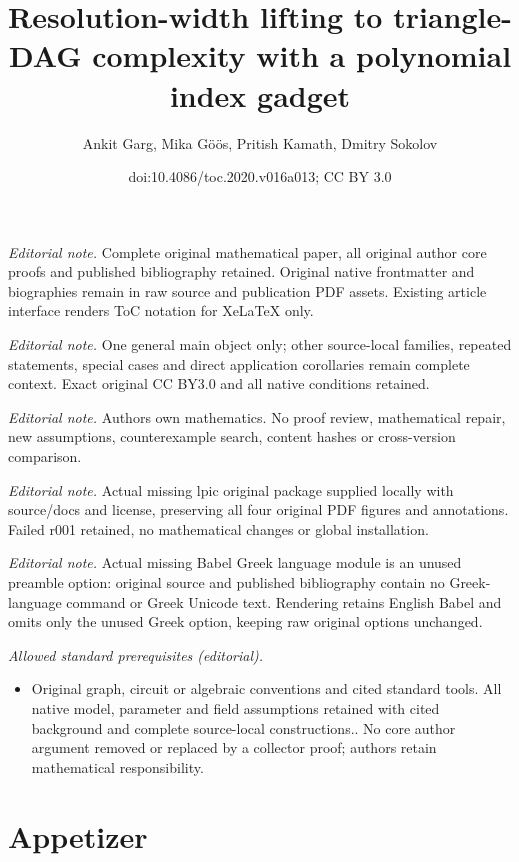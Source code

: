 \documentclass[11pt]{article}
\title{Resolution-width lifting to triangle-DAG complexity with a polynomial index gadget}
\author{Ankit Garg, Mika Göös, Pritish Kamath, Dmitry Sokolov}
\date{doi:10.4086/toc.2020.v016a013; CC BY 3.0}
\numberwithin{equation}{section}
\theoremstyle{definition}
\theoremstyle{plain}
\begin{document}
\maketitle
\noindent\textit{Editorial note.} Complete original mathematical paper, all original author core proofs and published bibliography retained. Original native frontmatter and biographies remain in raw source and publication PDF assets. Existing article interface renders ToC notation for XeLaTeX only.\par\medskip
\noindent\textit{Editorial note.} One general main object only; other source-local families, repeated statements, special cases and direct application corollaries remain complete context. Exact original CC BY3.0 and all native conditions retained.\par\medskip
\noindent\textit{Editorial note.} Authors own mathematics. No proof review, mathematical repair, new assumptions, counterexample search, content hashes or cross-version comparison.\par\medskip
\noindent\textit{Editorial note.} Actual missing lpic original package supplied locally with source/docs and license, preserving all four original PDF figures and annotations. Failed r001 retained, no mathematical changes or global installation.\par\medskip
\noindent\textit{Editorial note.} Actual missing Babel Greek language module is an unused preamble option: original source and published bibliography contain no Greek-language command or Greek Unicode text. Rendering retains English Babel and omits only the unused Greek option, keeping raw original options unchanged.\par\medskip
\noindent\textit{Allowed standard prerequisites (editorial).}\begin{itemize}
\item Original graph, circuit or algebraic conventions and cited standard tools. All native model, parameter and field assumptions retained with cited background and complete source-local constructions.. No core author argument removed or replaced by a collector proof; authors retain mathematical responsibility.
\end{itemize}\medskip
\section{Appetizer} \label{sec:intro}
\end{document}
